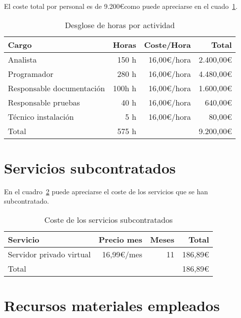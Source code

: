 El coste total por personal es de 9.200\euro como puede apreciarse en el cuado~\ref{tab:des_prec_horas}.

\begin{table}
	\centering
	
	\begin{tabular}{|l|r|r|r|}
		\hline
		Cargo & Horas & Coste/Hora & Total \\
		\hline
		Analista & 150 h & 16,00\euro/hora & 2.400,00\euro\\
		\hline
		Programador & 280 h & 16,00\euro/hora & 4.480,00\euro\\
		\hline
		Responsable documentación & 100h h & 16,00\euro/hora & 1.600,00\euro\\
		\hline
		Responsable pruebas & 40 h & 16,00\euro/hora & 640,00\euro\\
		\hline
		Técnico instalación & 5 h & 16,00\euro/hora & 80,00\euro\\
		\hline
		\hline
		Total & 575 h & \multicolumn{2}{|r|}{9.200,00\euro} \\
		\hline
	\end{tabular}
	\caption{Desglose de horas por actividad}\label{tab:des_prec_horas}
\end{table}


\section{Servicios subcontratados}

En el cuadro~\ref{tab:serv_subcont} puede apreciarse el coste de los servicios que se han subcontratado.

\begin{table}
	\centering
	
	\begin{tabular}{|l|r|r|r|}
		\hline
		Servicio & Precio mes & Meses & Total\\
		\hline
		Servidor privado virtual & 16,99\euro/mes & 11 & 186,89\euro\\
		\hline
		\hline
		\multicolumn{3}{|l|}{Total} & 186,89\euro\\
		\hline
	\end{tabular}
	\caption{Coste de los servicios subcontratados}\label{tab:serv_subcont}
\end{table}

\section{Recursos materiales empleados}

